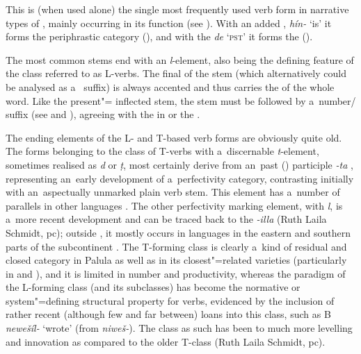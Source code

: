  This is (when used alone) the single most frequently used verb form in
narrative types of , mainly occurring in its  function (see ). With an added , \textit{hín-} `is' it forms the periphrastic category  (), and with the  \textit{de} `\textsc{pst}' it forms the  ().


The most common  stems end with an \textit{l}-element,
also being the defining feature of the class referred to as L-verbs. The final  of the stem
(which alternatively could be analysed as a~ suffix) is always accented and thus carries
the  of the whole word. Like the present"= inflected stem, the  stem must be
followed by a~number/ suffix (see  and ), agreeing with
the in  or the  .



The ending elements of the L- and T-based  verb forms are obviously quite old. The  forms belonging to the class of T-verbs with a~discernable \textit{t}-element, sometimes realised as \textit{d} or \textit{ṭ}, most certainly derive from an~\iliOIA past () participle \textit{-ta} \citep[952]{whitney1960}, representing an~early development of a~perfectivity category, contrasting initially with an~aspectually unmarked plain verb stem. This element has a~number of parallels in other \iliNIA languages \citep[269, 272]{masica1991}. The other perfectivity marking element, with \textit{l}, is a~more recent development and can be traced back to the \iliPrakrit \textit{-illa} (Ruth Laila Schmidt, pc); outside \iliShina, it mostly occurs in \iliNIA languages in the eastern and southern parts of the subcontinent \citep[270]{masica1991}. The T-forming class is clearly a~kind of residual and closed category in Palula as well as in its closest"=related varieties (particularly in \iliSauji and \iliKalkoti), and it is limited in number and productivity, whereas the paradigm of the L-forming class (and its subclasses) has become the normative or system"=defining structural property \citep[104]{mcmahon1994} for verbs, evidenced by the inclusion of rather recent (although few and far between) loans into this class, such as B \textit{newešíl-} `wrote' (from \iliKhowar \textit{niweš-}). The class as such has been  to much more levelling and innovation as compared to the older T-class (Ruth Laila Schmidt, pc).


